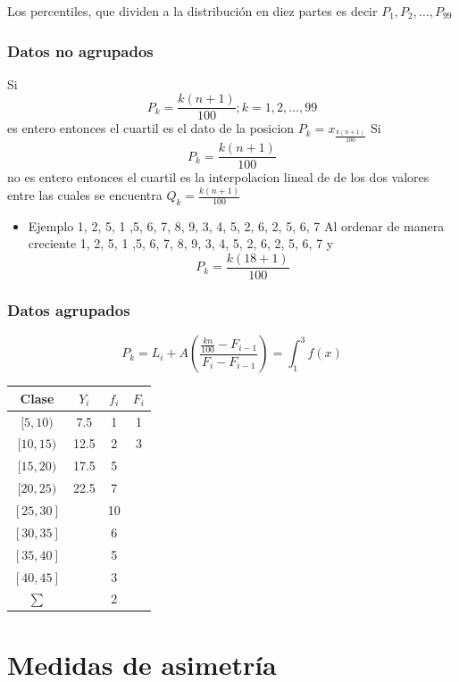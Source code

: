 \documentclass[
  11pt,
]{krantz}
\providecommand{\tightlist}{%
  \setlength{\itemsep}{0pt}\setlength{\parskip}{0pt}}
\theoremstyle{definition}
\theoremstyle{definition}
\theoremstyle{definition}
\theoremstyle{definition}
\theoremstyle{remark}
\begin{document}
Los percentiles, que dividen a la distribución en diez partes es decir \(P_1, P_2,\ldots, P_{99}\)

\hypertarget{datos-no-agrupados-2}{%
\subsection{Datos no agrupados}\label{datos-no-agrupados-2}}

Si \[P_k=\frac{k(n+1)}{100}; k=1, 2,  \ldots, 99\] es entero entonces el cuartil es el dato de la posicion \(P_k=x_\frac{k(n+1)}{100}\) Si \[P_k=\frac{k(n+1)}{100}\] no es entero entonces el cuartil es la interpolacion lineal de de los dos valores entre las cuales se encuentra \(Q_k=\frac{k(n+1)}{100}\)

\begin{itemize}
\tightlist
\item
  Ejemplo 1, 2, 5, 1 ,5, 6, 7, 8, 9, 3, 4, 5, 2, 6, 2, 5, 6, 7 Al ordenar de manera creciente 1, 2, 5, 1 ,5, 6, 7, 8, 9, 3, 4, 5, 2, 6, 2, 5, 6, 7 y \[P_k=\frac{k(18+1)}{100}\]
\end{itemize}

\hypertarget{datos-agrupados-2}{%
\subsection{Datos agrupados}\label{datos-agrupados-2}}

\[P_k=L_i+ A\left(\frac{\frac{kn}{100}-F_{i-1}}{F_i-F_{i-1}}\right)=\int_1^3f(x)\]

\begin{longtable}[]{@{}cccc@{}}
\toprule
Clase & \(Y_i\) & \(f_i\) & \(F_i\) \\
\midrule
\endhead
\([5,10)\) & 7.5 & 1 & 1 \\
\([10,15)\) & 12.5 & 2 & 3 \\
\([15,20)\) & 17.5 & 5 & \\
\([20,25)\) & 22.5 & 7 & \\
\([25,30]\) & & 10 & \\
\([30,35]\) & & 6 & \\
\([35,40]\) & & 5 & \\
\([40,45]\) & & 3 & \\
\(\sum\) & & 2 & \\
\bottomrule
\end{longtable}

\hypertarget{medidas-de-asimetruxeda}{%
\chapter{Medidas de asimetría}\label{medidas-de-asimetruxeda}}
\end{document}
